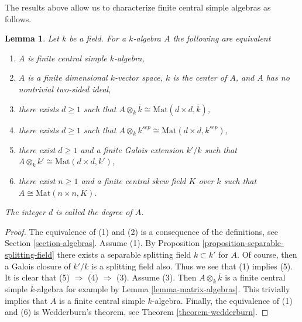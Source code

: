 \documentclass{stacks-project}
\theoremstyle{plain}
\newtheorem{lemma}[subsection]{Lemma}
\theoremstyle{definition}
\theoremstyle{remark}
\numberwithin{equation}{subsection}
\begin{document}
\noindent
The results above allow us to characterize finite central simple algebras
as follows.

\begin{lemma}
\label{lemma-finite-central-simple-algebra}
Let $k$ be a field. For a $k$-algebra $A$ the following are equivalent
\begin{enumerate}
\item $A$ is finite central simple $k$-algebra,
\item $A$ is a finite dimensional $k$-vector space, $k$ is the center of $A$,
and $A$ has no nontrivial two-sided ideal,
\item there exists $d \geq 1$ such that
$A \otimes_k \bar k \cong \text{Mat}(d \times d, \bar k)$,
\item there exists $d \geq 1$ such that
$A \otimes_k k^{sep} \cong \text{Mat}(d \times d, k^{sep})$,
\item there exist $d \geq 1$ and a finite Galois extension $k'/k$
such that
$A \otimes_k k' \cong \text{Mat}(d \times d, k')$,
\item there exist $n \geq 1$ and a finite central skew field $K$
over $k$ such that $A \cong \text{Mat}(n \times n, K)$.
\end{enumerate}
The integer $d$ is called the {\it degree} of $A$.
\end{lemma}

\begin{proof}
The equivalence of (1) and (2) is a consequence of the definitions, see
Section \ref{section-algebras}.
Assume (1). By
Proposition \ref{proposition-separable-splitting-field}
there exists a separable splitting field $k \subset k'$ for $A$.
Of course, then a Galois closure of $k'/k$ is a splitting field also.
Thus we see that (1) implies (5). It is clear that (5) $\Rightarrow$ (4)
$\Rightarrow$ (3). Assume (3). Then $A \otimes_k \overline{k}$
is a finite central simple $\overline{k}$-algebra for example by
Lemma \ref{lemma-matrix-algebras}.
This trivially implies that $A$ is a finite central simple $k$-algebra.
Finally, the equivalence of (1) and (6) is Wedderburn's theorem, see
Theorem \ref{theorem-wedderburn}.
\end{proof}














\end{document}
